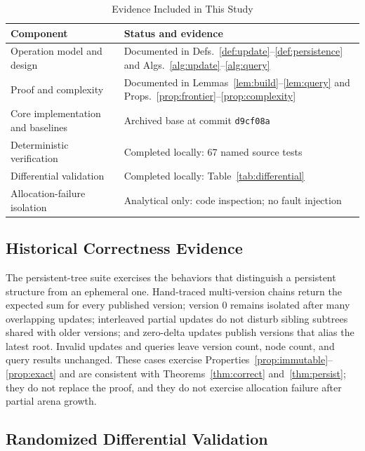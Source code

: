 \documentclass[conference]{IEEEtran}
\begin{document}
\begin{table}[!t]
\caption{Evidence Included in This Study}
\label{tab:status}
\centering
\footnotesize
\renewcommand{\arraystretch}{1.25}
\begin{tabularx}{\columnwidth}{@{}p{2.7cm}X@{}}
\toprule
\textbf{Component} & \textbf{Status and evidence} \\
\midrule
Operation model and design & Documented in Defs.~\ref{def:update}--\ref{def:persistence} and Algs.~\ref{alg:update}--\ref{alg:query} \\
Proof and complexity & Documented in Lemmas~\ref{lem:build}--\ref{lem:query} and Props.~\ref{prop:frontier}--\ref{prop:complexity} \\
Core implementation and baselines & Archived base at commit \texttt{d9cf08a} \\
Deterministic verification & Completed locally: 67 named source tests \\
Differential validation & Completed locally: Table~\ref{tab:differential} \\
Allocation-failure isolation & Analytical only: code inspection; no fault injection \\
\bottomrule
\end{tabularx}
\end{table}

\subsection{Historical Correctness Evidence}

The persistent-tree suite exercises the behaviors that distinguish a persistent structure from an
ephemeral one. Hand-traced multi-version chains return the expected sum for every published
version; version 0 remains isolated after many overlapping updates; interleaved partial updates
do not disturb sibling subtrees shared with older versions; and zero-delta updates publish
versions that alias the latest root. Invalid updates and queries leave version count, node count,
and query results unchanged. These cases exercise Properties~\ref{prop:immutable}--\ref{prop:exact}
and are consistent with Theorems~\ref{thm:correct} and~\ref{thm:persist}; they do not replace the
proof, and they do not exercise allocation failure after partial arena growth.

\subsection{Randomized Differential Validation}
\end{document}
